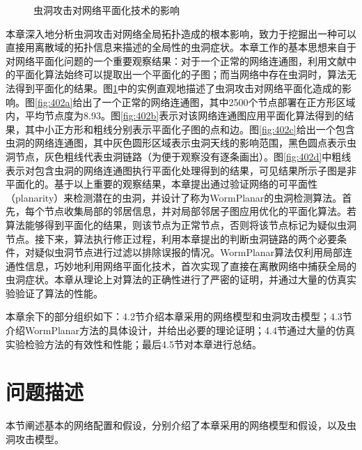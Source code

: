 \begin{figure}[t]
  \centering
  \hspace{0.5em}%
  \hspace{0.5em}%
     \hspace{0.5em}%
  \caption{虫洞攻击对网络平面化技术的影响}
  \label{fig:402}
\end{figure}
本章深入地分析虫洞攻击对网络全局拓扑造成的根本影响，致力于挖掘出一种可以直接用离散域的拓扑信息来描述的全局性的虫洞症状。本章工作的基本思想来自于对网络平面化问题的一个重要观察结果：对于一个正常的网络连通图，利用文献中的平面化算法始终可以提取出一个平面化的子图；而当网络中存在虫洞时，算法无法得到平面化的结果。图\ref{fig:402}中的实例直观地描述了虫洞攻击对网络平面化造成的影响。图\ref{fig:402a}给出了一个正常的网络连通图，其中2500个节点部署在正方形区域内，平均节点度为8.93。图\ref{fig:402b}表示对该网络连通图应用平面化算法得到的结果，其中小正方形和粗线分别表示平面化子图的点和边。图\ref{fig:402c}给出一个包含虫洞的网络连通图，其中灰色圆形区域表示虫洞天线的影响范围，黑色圆点表示虫洞节点，灰色粗线代表虫洞链路（为便于观察没有逐条画出）。图\ref{fig:402d}中粗线表示对包含虫洞的网络连通图执行平面化处理得到的结果，可见结果所示子图是非平面化的。基于以上重要的观察结果，本章提出通过验证网络的可平面性（planarity）来检测潜在的虫洞，并设计了称为WormPlanar的虫洞检测算法。首先，每个节点收集局部的邻居信息，并对局部邻居子图应用优化的平面化算法。若算法能够得到平面化的结果，则该节点为正常节点，否则将该节点标记为疑似虫洞节点。接下来，算法执行修正过程，利用本章提出的判断虫洞链路的两个必要条件，对疑似虫洞节点进行过滤以排除误报的情况。WormPlanar算法仅利用局部连通性信息，巧妙地利用网络平面化技术，首次实现了直接在离散网络中捕获全局的虫洞症状。本章从理论上对算法的正确性进行了严密的证明，并通过大量的仿真实验验证了算法的性能。

本章余下的部分组织如下：4.2节介绍本章采用的网络模型和虫洞攻击模型；4.3节介绍WormPlanar方法的具体设计，并给出必要的理论证明；4.4节通过大量的仿真实验检验方法的有效性和性能；最后4.5节对本章进行总结。
\section{问题描述}
本节阐述基本的网络配置和假设，分别介绍了本章采用的网络模型和假设，以及虫洞攻击模型。
